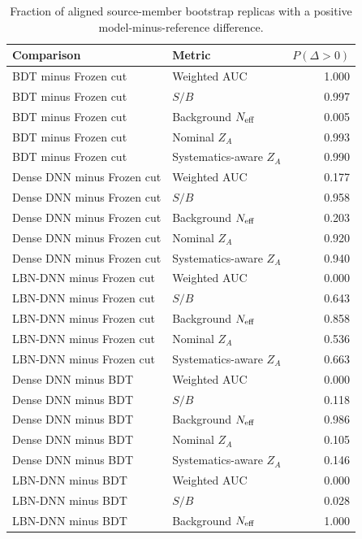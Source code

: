 \begin{table}[tb]
  \centering
  \footnotesize
  \caption{Fraction of aligned source-member bootstrap replicas with a positive model-minus-reference difference.}
  \label{tab:paired-positive-fraction}
  \begin{tabular}{llr}
    \toprule
    Comparison & Metric & $P(\Delta>0)$ \\
    \midrule
    BDT minus Frozen cut & Weighted AUC & 1.000 \\
    BDT minus Frozen cut & $S/B$ & 0.997 \\
    BDT minus Frozen cut & Background $N_{\rm eff}$ & 0.005 \\
    BDT minus Frozen cut & Nominal $Z_A$ & 0.993 \\
    BDT minus Frozen cut & Systematics-aware $Z_A$ & 0.990 \\
    Dense DNN minus Frozen cut & Weighted AUC & 0.177 \\
    Dense DNN minus Frozen cut & $S/B$ & 0.958 \\
    Dense DNN minus Frozen cut & Background $N_{\rm eff}$ & 0.203 \\
    Dense DNN minus Frozen cut & Nominal $Z_A$ & 0.920 \\
    Dense DNN minus Frozen cut & Systematics-aware $Z_A$ & 0.940 \\
    LBN-DNN minus Frozen cut & Weighted AUC & 0.000 \\
    LBN-DNN minus Frozen cut & $S/B$ & 0.643 \\
    LBN-DNN minus Frozen cut & Background $N_{\rm eff}$ & 0.858 \\
    LBN-DNN minus Frozen cut & Nominal $Z_A$ & 0.536 \\
    LBN-DNN minus Frozen cut & Systematics-aware $Z_A$ & 0.663 \\
    Dense DNN minus BDT & Weighted AUC & 0.000 \\
    Dense DNN minus BDT & $S/B$ & 0.118 \\
    Dense DNN minus BDT & Background $N_{\rm eff}$ & 0.986 \\
    Dense DNN minus BDT & Nominal $Z_A$ & 0.105 \\
    Dense DNN minus BDT & Systematics-aware $Z_A$ & 0.146 \\
    LBN-DNN minus BDT & Weighted AUC & 0.000 \\
    LBN-DNN minus BDT & $S/B$ & 0.028 \\
    LBN-DNN minus BDT & Background $N_{\rm eff}$ & 1.000 \\

\end{tabular}
\end{table}

